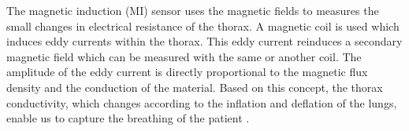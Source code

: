 The magnetic induction (MI) sensor uses the magnetic fields to measures the small changes in electrical resistance of the thorax. A magnetic coil is used which induces eddy currents within the thorax. This eddy current reinduces a secondary magnetic field which can be measured with the same or another coil. The amplitude of the eddy current is directly proportional to the magnetic flux density and the conduction of the material. Based on this concept, the thorax conductivity, which changes according to the inflation and deflation of the lungs, enable us to capture the breathing of the patient \cite{1742-6596-434-1-012085}. 
\begin{figure}%
	\centering
	
	\hspace{8pt}%
	\hspace{8pt}%
	 \\

\end{figure}
